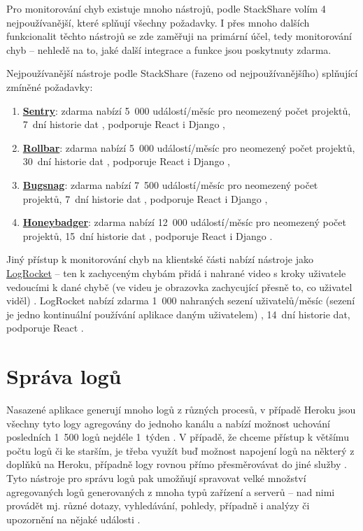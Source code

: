 Pro monitorování chyb existuje mnoho nástrojů, podle StackShare \cite{stackshare-exception} volím 4 nejpoužívanější, které splňují všechny požadavky. I přes mnoho dalších funkcionalit těchto nástrojů se zde zaměřuji na primární účel, tedy monitorování chyb -- nehledě na to, jaké další integrace a funkce jsou poskytnuty zdarma.

Nejpoužívanější nástroje podle StackShare (řazeno od nejpoužívanějšího) \cite{stackshare-exception} splňující zmíněné požadavky:
\begin{enumerate}
    \item \href{https://sentry.io/}{\textbf{Sentry}}: zdarma nabízí 5~000 událostí/měsíc pro neomezený počet projektů, 7~dní historie dat \cite{sentry-pricing}, podporuje React i Django \cite{sentry-platforms},
    \item \href{https://rollbar.com/}{\textbf{Rollbar}}: zdarma nabízí 5~000 událostí/měsíc pro neomezený počet projektů, 30~dní historie dat \cite{rollbar-pricing}, podporuje React i Django \cite{rollbar-platforms},
    \item \href{https://www.bugsnag.com/}{\textbf{Bugsnag}}: zdarma nabízí 7~500 událostí/měsíc pro neomezený počet projektů, 7~dní historie dat \cite{bugsnag-pricing}, podporuje React i Django \cite{bugsnag-platforms},
    \item \href{https://www.honeybadger.io/}{\textbf{Honeybadger}}: zdarma nabízí 12~000 událostí/měsíc pro neomezený počet projektů, 15~dní historie dat \cite{honeybadger-pricing}, podporuje React \cite{honeybadger-react} i Django \cite{honeybadger-django}.
\end{enumerate}

Jiný přístup k monitorování chyb na klientské části nabízí nástroje jako \href{https://logrocket.com/}{LogRocket} -- ten k zachyceným chybám přidá i nahrané video s kroky uživatele vedoucími k dané chybě (ve videu je obrazovka zachycující přesně to, co uživatel viděl) \cite{logrocket}. LogRocket nabízí zdarma 1~000 nahraných sezení uživatelů/měsíc (sezení je jedno kontinuální používání aplikace daným uživatelem) \cite{logrocket-pricing}, 14~dní historie dat, podporuje React \cite{logrocket-react}.

\section{Správa logů}
Nasazené aplikace generují mnoho logů z různých procesů, v případě Heroku jsou všechny tyto logy agregovány do jednoho kanálu a nabízí možnost uchování posledních 1~500 logů nejdéle 1~týden \cite{tools-logs1}. V případě, že chceme přístup k většímu počtu logů či ke starším, je třeba využít buď možnost napojení logů na některý z doplňků na Heroku, případně logy rovnou přímo přesměrovávat do jiné služby \cite{tools-logs1}. Tyto nástroje pro správu logů pak umožňují spravovat velké množství agregovaných logů generovaných z mnoha typů zařízení a serverů -- nad nimi provádět mj. různé dotazy, vyhledávání, pohledy, případně i analýzy či upozornění na nějaké události \cite{tools-logs2}.

